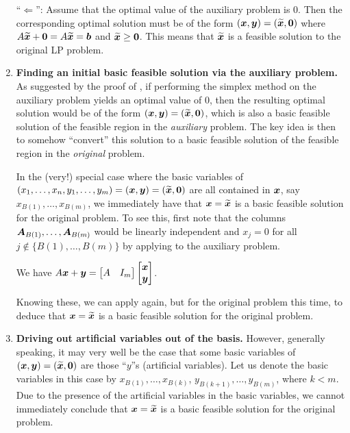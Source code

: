 \begin{enumerate}
\begin{pf}
``\(\Leftarrow\)'': Assume that the optimal value of the auxiliary problem is
\(0\). Then the corresponding optimal solution must be of the form
\((\bm{x},\bm{y})=(\widetilde{\bm{x}},\bm{0})\) where
\(A\widetilde{\bm{x}}+\bm{0}=A\widetilde{\bm{x}}=\bm{b}\) and
\(\widetilde{\bm{x}}\ge \bm{0}\). This means that \(\widetilde{\bm{x}}\)
is a feasible solution to the original LP problem.
\end{pf}
\item\label{it:aux-find-bfs} \textbf{Finding an initial basic
feasible solution via the auxiliary problem.} As suggested by the proof of
, if performing the simplex method on the
auxiliary problem yields an optimal value of \(0\), then the resulting optimal
solution would be of the form
\((\bm{x},\bm{y})=(\widetilde{\bm{x}},\bm{0})\), which is also a basic
feasible solution of the feasible region in the \emph{auxiliary} problem.  The
key idea is then to somehow ``convert'' this solution to a basic feasible
solution of the feasible region in the \emph{original} problem.

In the (very!) special case where the basic variables of
\((x_{1},\dotsc,x_{n},y_{1},\dotsc,y_{m})=(\bm{x},\bm{y})=(\widetilde{\bm{x}},\bm{0})\)
are all contained in \(\bm{x}\), say \(x_{B(1)},\dotsc,x_{B(m)}\), we
immediately have that \(\bm{x}=\widetilde{\bm{x}}\) is a basic feasible
solution for the original problem. To see this, first note that the columns
\(\bm{A}_{B(1)},\dotsc,\bm{A}_{B(m)}\) would be linearly independent and
\(x_{j}=0\) for all \(j\notin\{B(1),\dotsc,B(m)\}\) by applying
 to the auxiliary problem. \begin{note} We have
\(A\bm{x}+\bm{y}=\begin{bmatrix}A&I_m\end{bmatrix}\begin{bmatrix}\bm{x}\\\bm{y}\end{bmatrix}\).
\end{note}
Knowing these, we can apply  again, but for the
original problem this time, to deduce that \(\bm{x}=\widetilde{\bm{x}}\) is
a basic feasible solution for the original problem.

\item\label{it:drive-out-art-var} \textbf{Driving out artificial variables out
of the basis.} However, generally speaking, it may very well be the case that
some basic variables of \((\bm{x},\bm{y})=(\widetilde{\bm{x}},\bm{0})\)
are those ``\(y\)''s (artificial variables). Let us denote the basic variables
in this case by \(x_{B(1)},\dotsc,x_{B(k)}\), \(y_{B(k+1)},\dotsc,y_{B(m)}\),
where \(k<m\).  Due to the presence of the artificial variables in the basic
variables, we cannot immediately conclude that
\(\bm{x}=\widetilde{\bm{x}}\) is a basic feasible solution for the original
problem.


\end{enumerate}

